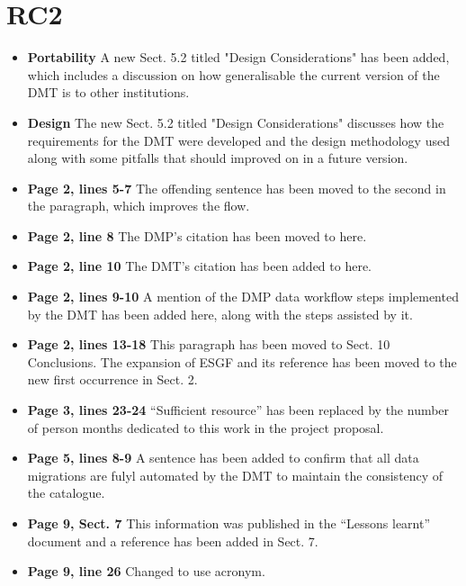 \documentclass[12pt,a4paper]{article}
\begin{document}
\section{RC2}
\begin{itemize}
\item \textbf{Portability} A new Sect. 5.2 titled "Design Considerations" has been added, which includes a discussion on how generalisable the current version of the DMT is to other institutions.
	 
\item \textbf{Design} The new Sect. 5.2 titled "Design Considerations" discusses how the requirements for the DMT were developed and the design methodology used along with some pitfalls that should improved on in a future version.

\item \textbf{Page 2, lines 5-7} The offending sentence has been moved to the second in the paragraph, which improves the flow.

\item \textbf{Page 2, line 8} The DMP's citation has been moved to here.

\item \textbf{Page 2, line 10} The DMT's citation has been added to here.

\item \textbf{Page 2, lines 9-10} A mention of the DMP data workflow steps implemented by the DMT has been added here, along with the steps assisted by it.

\item \textbf{Page 2, lines 13-18} This paragraph has been moved to Sect. 10 Conclusions. The expansion of ESGF and its reference has been moved to the new first occurrence in Sect. 2.

\item \textbf{Page 3, lines 23-24} ``Sufficient resource'' has been replaced by the number of person months dedicated to this work in the project proposal.

\item \textbf{Page 5, lines 8-9} A sentence has been added to confirm that all data migrations are fulyl automated by the DMT to maintain the consistency of the catalogue.

\item \textbf{Page 9, Sect. 7} This information was published in the ``Lessons learnt'' document and a reference has been added in Sect. 7.

\item \textbf{Page 9, line 26} Changed to use acronym.


\end{itemize}
\end{document}
